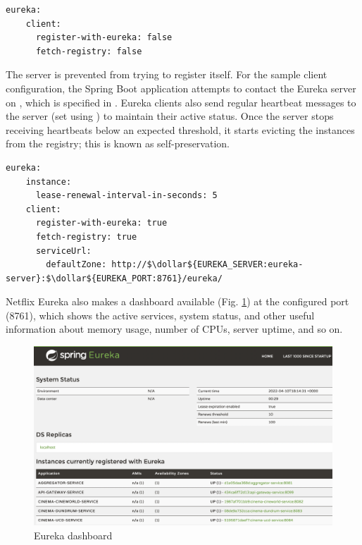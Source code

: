 \begin{lstlisting}[caption=Snippet from Eureka server's application properties]
  eureka:
    client:
      register-with-eureka: false
      fetch-registry: false
\end{lstlisting}

The server is prevented from trying to register itself. For the sample client configuration, the Spring Boot application attempts to contact the Eureka server on , which is specified in . Eureka clients also send regular heartbeat messages to the server (set using ) to maintain their active status. Once the server stops receiving heartbeats below an expected threshold, it starts evicting the instances from the registry; this is known as self-preservation.

\begin{lstlisting}[caption=Snippet from a Eureka client's application properties]
  eureka:
    instance:
      lease-renewal-interval-in-seconds: 5
    client:
      register-with-eureka: true
      fetch-registry: true
      serviceUrl:
        defaultZone: http://$\dollar${EUREKA_SERVER:eureka-server}:$\dollar${EUREKA_PORT:8761}/eureka/
\end{lstlisting}

Netflix Eureka also makes a dashboard available (Fig. \ref{fig:eureka-dashboard}) at the configured port (8761), which shows the active services, system status, and other useful information about memory usage, number of CPUs, server uptime, and so on.

\begin{figure}[H]
	\centering
	\includegraphics[width=1.0\linewidth]{./assets/images/case-studies/eureka-dashboard.png}
	\caption{Eureka dashboard}
	\label{fig:eureka-dashboard}
\end{figure}

